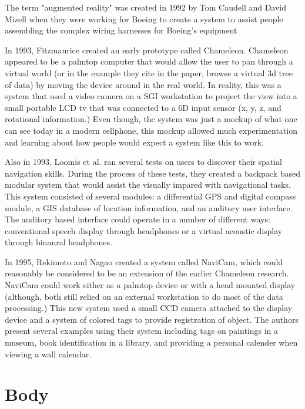 \documentclass{acm_proc_article-sp}
\begin{document}
The term "augmented reality" was created in 1992 by Tom Caudell and David Mizell when they were working for Boeing to create a system to assist people assembling the complex wiring harnesses for Boeing's equipment \cite{citeulike:6081386} \cite{carmigniani2011augmented}

In 1993, Fitzmaurice created an early prototype called Chameleon.  Chameleon appeared to be a palmtop computer that would allow the user to pan through a virtual world (or in the example they cite in the paper, browse a virtual 3d tree of data) by moving the device around in the real world.  In reality, this was a system that used a video camera on a SGI workstation to project the view into a small portable LCD tv that was connected to a 6D input sensor (x, y, z, and rotational information.)  Even though, the system was just a mockup of what one can see today in a modern cellphone, this mockup allowed much experimentation and learning about how people would expect a system like this to work.\cite{fitzmaurice1993situated}

Also in 1993, Loomis et al. ran several tests on users to discover their spatial navigation skills.  \cite{loomis1993nonvisual} During the process of these tests, they created a backpack based modular system that would assist the visually impared with navigational tasks.  This system consisted of several modules: a differential GPS and digital compass module, a GIS database of location information, and an auditory user interface.  The auditory based interface could operate in a number of different ways: conventional speech display through headphones or a virtual acoustic display through binaural headphones. \cite{loomis1994personal}

In 1995, Rekimoto and Nagao created a system called NaviCam, which could reasonably be considered to be an extension of the earlier Chameleon research. \cite{fitzmaurice1993situated}  NaviCam could work either as a palmtop device or with a head mounted display (although, both still relied on an external workstation to do most of the data processing.)  This new system used a small CCD camera attached to the display device and a system of colored tags to provide registration of object.  The authors present several examples using their system including tags on paintings in a museum, book identification in a library, and providing a personal calender when viewing a wall calendar. \cite{rekimoto1995world}
\section{Body}
\end{document}
